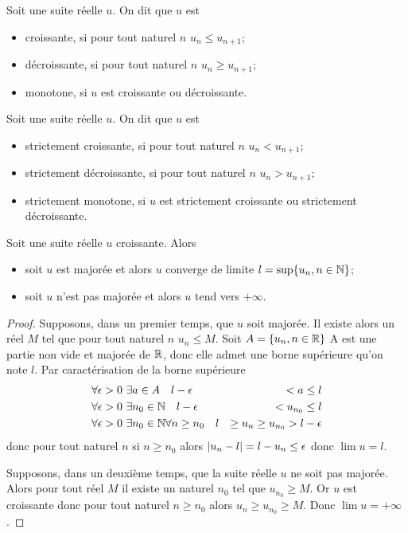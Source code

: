 \begin{defdef}
  Soit une suite réelle $u$. On dit que $u$ est
  \begin{itemize}
  \item croissante, si pour tout naturel $n$ $u_n \leq u_{n+1}$;
  \item décroissante, si pour tout naturel $n$ $u_n \geq u_{n+1}$;
  \item monotone, si $u$ est croissante ou décroissante.
  \end{itemize}
\end{defdef}
\begin{defdef}
  Soit une suite réelle $u$. On dit que $u$ est
  \begin{itemize}
  \item strictement croissante, si pour tout naturel $n$ $u_n < u_{n+1}$;
  \item strictement décroissante, si pour tout naturel $n$ $u_n > u_{n+1}$;
  \item strictement monotone, si $u$ est strictement croissante ou strictement décroissante.
  \end{itemize}
\end{defdef}
\begin{theo}
  Soit une suite réelle $u$ croissante. Alors
  \begin{itemize}
  \item soit $u$ est majorée et alors $u$ converge de limite $l=\sup\{u_n, n \in \mathbb{N}\}$;
  \item soit $u$ n'est pas majorée et alors $u$ tend vers $+\infty$.
  \end{itemize}
\end{theo}
\begin{proof}
  Supposons, dans un premier temps, que $u$ soit majorée. Il existe alors un réel $M$ tel que pour tout naturel $n$ $u_n \leq M$. Soit $A=\{u_n, n \in \mathbb{R}\}$ A est une partie non vide et majorée de $\mathbb{R}$, donc elle admet une borne supérieure qu'on note $l$. Par caractérisation de la borne supérieure
  \begin{align}
      \forall \epsilon > 0 & \ \exists a \in A \quad l-\epsilon &< a \leq l \\
      \forall \epsilon > 0 & \ \exists n_0 \in \mathbb{N} \quad l-\epsilon &< u_{n_0} \leq l \\
      \forall \epsilon > 0 & \ \exists n_0 \in \mathbb{N} \forall n \geq n_0 \quad l &\geq u_n \geq u_{n_0} > l-\epsilon
  \end{align}
donc pour tout naturel $n$ si $n \geq n_0$ alors $\left\lvert u_n-l\right\rvert=l-u_n \leq \epsilon$ donc $\lim u =l$.

Supposons, dans un deuxième temps, que la suite réelle $u$ ne soit pas majorée. Alors pour tout réel $M$ il existe un naturel $n_0$ tel que $u_{n_0} \geq M$. Or $u$ est croissante donc pour tout naturel $n \geq n_0$ alors $u_n \geq u_{n_0} \geq M$. Donc $\lim u =+\infty$.
\end{proof}

